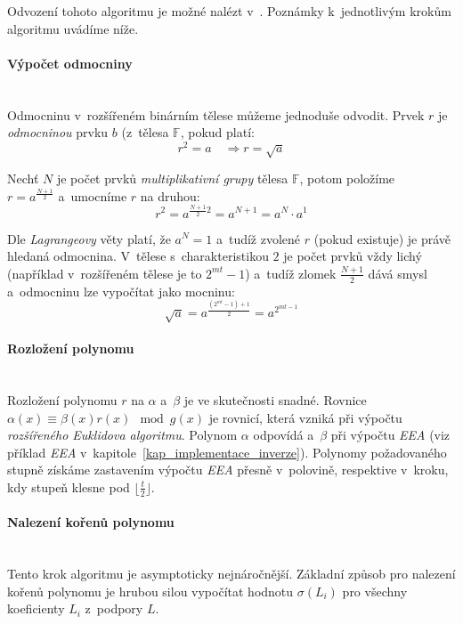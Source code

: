 \documentclass[thesis=M,czech,hidelinks]{FITthesis}[2012/06/26]
\newcommand{\0}{{\textcolor[gray]{0.75}{0}}}
\begin{document}
Odvození tohoto algoritmu je možné nalézt v~\cite{Patterson}. Poznámky
k~jednotlivým krokům algoritmu uvádíme níže.

\paragraph{Výpočet odmocniny} \hfil \\
Odmocninu v~rozšířeném binárním tělese můžeme jednoduše odvodit. Prvek $r$
je \emph{odmocninou} prvku $b$ (z~tělesa $\mathbb{F}$, pokud platí:
$$ r^2 = a \quad \Rightarrow r = \sqrt{a} $$

Nechť $N$ je počet prvků \emph{multiplikativní grupy} tělesa $\mathbb{F}$, potom
položíme \\
$r = a^{\frac{N+1}{2}} $ a~umocníme $r$ na druhou:
$$ r^2 = a^{\frac{N+1}{2} 2} = a^{N+1} = a^N \cdot a^1 $$

Dle \emph{Lagrangeovy} věty platí, že $a^N = 1 $ a~tudíž zvolené $r$ (pokud
existuje) je právě hledaná odmocnina. V~tělese s~charakteristikou $2$ je počet
prvků vždy lichý (například v~rozšířeném tělese je to $2^{mt}-1$) a~tudíž zlomek
$\frac{N+1}{2}$ dává smysl a~odmocninu lze vypočítat jako mocninu:
$$ \sqrt{a} = a^{\frac{(2^{mt}-1) + 1}{2}} = a^{2^{mt - 1}} $$

\paragraph{Rozložení polynomu} \hfil \\
Rozložení polynomu $r$ na $\alpha$ a~$\beta$ je ve skutečnosti snadné. Rovnice
$\alpha(x) \equiv \beta(x) r(x) \mod g(x)$ je rovnicí, která vzniká při výpočtu
\emph{rozšířeného Euklidova algoritmu}. Polynom $\alpha$ odpovídá 
a~$\beta$  při výpočtu \emph{EEA} (viz příklad \emph{EEA}
v~kapitole~\ref{kap_implementace_inverze}). Polynomy požadovaného stupně získáme
zastavením výpočtu \emph{EEA} přesně v~polovině, respektive v~kroku, kdy
stupeň  klesne pod $\lfloor\frac{t}{2}\rfloor$.

\paragraph{Nalezení kořenů polynomu} \hfil \\
Tento krok algoritmu je asymptoticky nejnáročnější. Základní způsob pro nalezení
kořenů polynomu je hrubou silou vypočítat hodnotu $\sigma(L_i)$ pro všechny
koeficienty $L_i$ z~podpory $L$.
\end{document}
